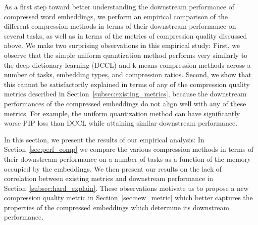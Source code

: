 As a first step toward better understanding the downstream performance of compressed word embeddings, we perform an empirical comparison of the different compression methods in terms of their downstream performance on several tasks, as well as in terms of the metrics of compression quality discussed above.
We make two surprising observations in this empirical study:
First, we observe that the simple uniform quantization method performs very similarly to the deep dictionary learning (DCCL) and k-means compression methods across a number of tasks, embedding types, and compression ratios.
Second, we show that this cannot be satisfactorily explained in terms of any of the compression quality metrics described in Section~\ref{subsec:existing_metrics}, because the downstream performances of the compressed embeddings do not align well with any of these metrics.
For example, the uniform quantization method can have significantly worse PIP loss than DCCL while attaining similar downstream performance.

In this section, we present the results of our empirical analysis:
In Section~\ref{sec:perf_comp} we compare the various compression methods in terms of their downstream performance on a number of tasks as a function of the memory occupied by the embeddings.
We then present our results on the lack of correlation between existing metrics and downstream performance in Section~\ref{subsec:hard_explain}.
These observations motivate us to propose a new compression quality metric in Section~\ref{sec:new_metric} which better captures the properties of the compressed embeddings which determine its downstream performance.

